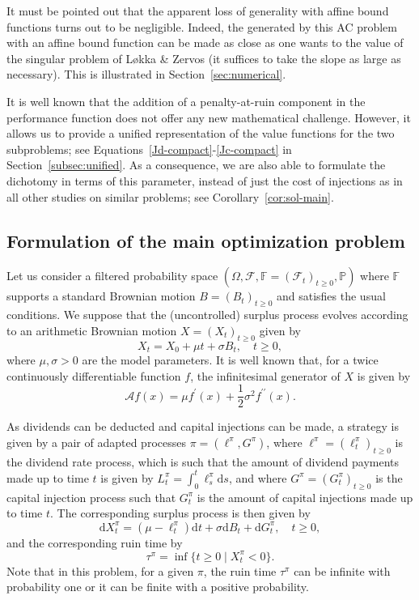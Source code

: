 \documentclass[11pt,reqno]{amsart}
\newcommand{\p}{\mathbb{P}}
\newcommand{\F}{\mathcal{F}}
\newcommand{\diff}{\mathrm{d}}
\renewcommand{\geq}{\geqslant}
\begin{document}
It must be pointed out that the apparent loss of generality with affine bound functions turns out to be negligible. Indeed, the generated by this AC problem with an affine bound function can be made as close as one wants to the value of the singular problem of L\o kka \& Zervos (it suffices to take the slope as large as necessary). This is illustrated in Section~\ref{sec:numerical}.

It is well known that the addition of a penalty-at-ruin component in the performance function does not offer any new mathematical challenge. However, it allows us to provide a unified representation of the value functions for the two subproblems; see Equations~\eqref{Jd-compact}-\eqref{Jc-compact} in Section~\ref{subsec:unified}. As a consequence, we are also able to formulate the dichotomy in terms of this parameter, instead of just the cost of injections as in all other studies on similar problems; see Corollary~\ref{cor:sol-main}.

\subsection{Formulation of the main optimization problem}\label{sec:framework}

Let us consider a filtered probability space $(\Omega, \F, \mathbb{F} = (\F_t)_{t\geq 0}, \p)$ where $\mathbb{F}$ supports a standard Brownian motion $B = (B_t)_{t\geq 0}$ and satisfies the usual conditions. We suppose that the (uncontrolled) surplus process evolves according to an arithmetic Brownian motion $X=(X_t)_{t\geq 0}$ given by
\begin{equation}
    X_t = X_0 + \mu t + \sigma B_t, \quad t\geq 0,
\end{equation}
where $\mu,\sigma>0$ are the model parameters. It is well known that, for a twice continuously differentiable function $f$, the infinitesimal generator of $X$ is given by
\begin{equation}
    \mathcal{A}f(x) = \mu f^\prime(x) + \frac{1}{2}\sigma^2f^{\prime \prime}(x) .
\end{equation}

As dividends can be deducted and capital injections can be made, a strategy is given by a pair of adapted processes $\pi = (\ell^\pi, G^\pi)$, where $\ell^\pi=(\ell^\pi_t)_{t\geq 0}$ is the dividend rate process, which is such that the amount of dividend payments made up to time $t$ is given by $L^\pi_t = \int_0^t \ell^\pi_s\diff s$, and where $G^\pi=(G^\pi_t)_{t\geq 0}$ is the capital injection process such that $G^\pi_t$ is the amount of capital injections made up to time $t$. The corresponding surplus process is then given by
\begin{equation}
    \diff X^\pi_t = (\mu-\ell^\pi_t)\diff t + \sigma \diff B_t + \diff G^\pi_t, \quad t\geq 0,
\end{equation}
and the corresponding ruin time by
\begin{equation}
    \tau^\pi = \inf\{t \geq 0 \mid X^\pi_t < 0\}.
\end{equation}
Note that in this problem, for a given $\pi$, the ruin time $\tau^\pi$ can be infinite with probability one or it can be finite with a positive probability.
\end{document}
